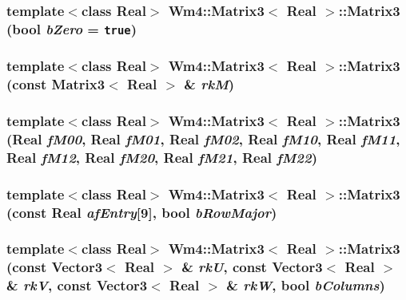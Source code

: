 \subsubsection{\setlength{\rightskip}{0pt plus 5cm}template$<$class Real$>$ {\bf Wm4::Matrix3}$<$ Real $>$::{\bf Matrix3} (bool {\em b\-Zero} = {\tt true})}\label{classWm4_1_1Matrix3_a55b2f8807d619c6f35c4b862e66b797}


\subsubsection{\setlength{\rightskip}{0pt plus 5cm}template$<$class Real$>$ {\bf Wm4::Matrix3}$<$ Real $>$::{\bf Matrix3} (const {\bf Matrix3}$<$ Real $>$ \& {\em rk\-M})}\label{classWm4_1_1Matrix3_d0f2c654dcb88abddabbfc98d595476e}


\subsubsection{\setlength{\rightskip}{0pt plus 5cm}template$<$class Real$>$ {\bf Wm4::Matrix3}$<$ Real $>$::{\bf Matrix3} (Real {\em f\-M00}, Real {\em f\-M01}, Real {\em f\-M02}, Real {\em f\-M10}, Real {\em f\-M11}, Real {\em f\-M12}, Real {\em f\-M20}, Real {\em f\-M21}, Real {\em f\-M22})}\label{classWm4_1_1Matrix3_a8cbc9a34dfb2467f05b8e10bec7191a}


\subsubsection{\setlength{\rightskip}{0pt plus 5cm}template$<$class Real$>$ {\bf Wm4::Matrix3}$<$ Real $>$::{\bf Matrix3} (const Real {\em af\-Entry}[9], bool {\em b\-Row\-Major})}\label{classWm4_1_1Matrix3_1cbbfa4bd490e8c50f8e743b15272bcd}


\subsubsection{\setlength{\rightskip}{0pt plus 5cm}template$<$class Real$>$ {\bf Wm4::Matrix3}$<$ Real $>$::{\bf Matrix3} (const {\bf Vector3}$<$ Real $>$ \& {\em rk\-U}, const {\bf Vector3}$<$ Real $>$ \& {\em rk\-V}, const {\bf Vector3}$<$ Real $>$ \& {\em rk\-W}, bool {\em b\-Columns})}\label{classWm4_1_1Matrix3_4e654958d2ef2649a23093f148f82a25}


